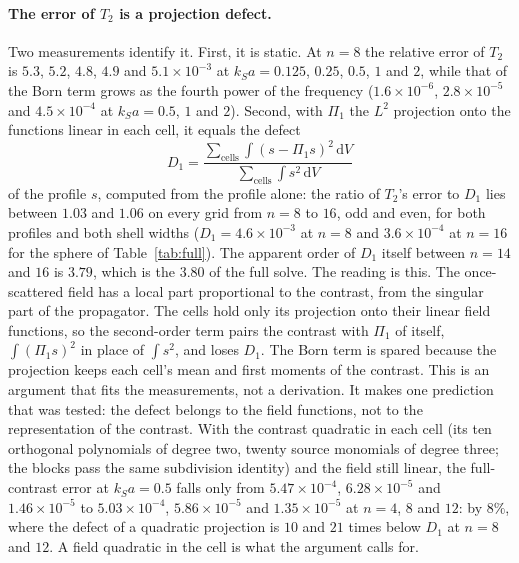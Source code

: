 \documentclass[11pt,a4paper]{article}
\newcommand{\dd}{\mathrm{d}}
\begin{document}
\paragraph{The error of $T_2$ is a projection defect.} Two measurements identify it. First, it is static.
At $n=8$ the relative error of $T_2$ is $5.3$, $5.2$, $4.8$, $4.9$ and $5.1\times10^{-3}$ at
$k_Sa=0.125$, $0.25$, $0.5$, $1$ and $2$, while that of the Born term grows as the fourth power of the
frequency ($1.6\times10^{-6}$, $2.8\times10^{-5}$ and $4.5\times10^{-4}$ at $k_Sa=0.5$, $1$ and $2$).
Second, with $\Pi_1$ the $L^2$ projection onto the functions linear in each cell, it equals the defect
\begin{equation}
D_1=\frac{\sum_{\text{cells}}\int(s-\Pi_1s)^2\,\dd V}{\sum_{\text{cells}}\int s^2\,\dd V}
\label{eq:defect}
\end{equation}
of the profile $s$, computed from the profile alone: the ratio of $T_2$'s error to $D_1$ lies between
$1.03$ and $1.06$ on every grid from $n=8$ to $16$, odd and even, for both profiles and both shell
widths ($D_1=4.6\times10^{-3}$ at $n=8$ and $3.6\times10^{-4}$ at $n=16$ for the sphere of
Table~\ref{tab:full}). The apparent order of $D_1$ itself between $n=14$ and $16$ is $3.79$, which
is the $3.80$ of the full solve. The reading is this. The once-scattered field has a local part
proportional to the contrast, from the singular part of the propagator. The cells hold only its
projection onto their linear field functions, so the second-order term pairs the contrast with
$\Pi_1$ of itself, $\int(\Pi_1s)^2$ in place of $\int s^2$, and loses $D_1$. The Born term is spared
because the projection keeps each cell's mean and first moments of the contrast. This is an argument
that fits the measurements, not a derivation. It makes one prediction that was tested: the defect belongs to
the field functions, not to the representation of the contrast. With the contrast quadratic in each cell
(its ten orthogonal polynomials of degree two, twenty source monomials of degree three; the blocks pass
the same subdivision identity) and the field still linear, the full-contrast error at $k_Sa=0.5$ falls
only from $5.47\times10^{-4}$, $6.28\times10^{-5}$ and $1.46\times10^{-5}$ to $5.03\times10^{-4}$,
$5.86\times10^{-5}$ and $1.35\times10^{-5}$ at $n=4$, $8$ and $12$: by $8\%$, where the defect of a
quadratic projection is $10$ and $21$ times below $D_1$ at $n=8$ and $12$. A field quadratic in the cell
is what the argument calls for.
\end{document}
